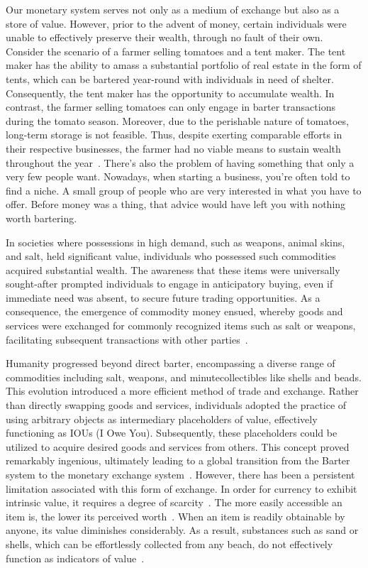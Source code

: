 Our monetary system serves not only as a medium of exchange but also as a store of value. However, prior to the advent of money, certain individuals were unable to effectively preserve their wealth, through no fault of their own. Consider the scenario of a farmer selling tomatoes and a tent maker. The tent maker has the ability to amass a substantial portfolio of real estate in the form of tents, which can be bartered year-round with individuals in need of shelter. Consequently, the tent maker has the opportunity to accumulate wealth. In contrast, the farmer selling tomatoes can only engage in barter transactions during the tomato season. Moreover, due to the perishable nature of tomatoes, long-term storage is not feasible. Thus, despite exerting comparable efforts in their respective businesses, the farmer had no viable means to sustain wealth
throughout the year~\cite{de2016origins}. There's also the problem of having something that only a very few people want. Nowadays, when starting a business, you're often told to find a niche. A small group of people who are very interested in what you have to offer. Before money was a thing, that advice would have left you with nothing worth bartering.

In societies where possessions in high demand, such as weapons, animal skins, and salt, held significant value, individuals who possessed such commodities acquired substantial wealth. The awareness that these items were universally sought-after prompted individuals to engage in anticipatory buying, even if immediate need was absent, to secure future trading opportunities. As a consequence, the emergence of commodity money ensued, whereby goods and services were exchanged for commonly recognized items such as salt or weapons, facilitating subsequent transactions with other parties~\cite{polanyi1965trade}.

Humanity progressed beyond direct barter, encompassing a diverse range of commodities including salt, weapons, and minutecollectibles like shells and beads. This evolution introduced a more efficient method of trade and exchange. Rather than directly swapping goods and services, individuals adopted the practice of using arbitrary objects as intermediary placeholders of value, effectively functioning as IOUs (I Owe You). Subsequently, these placeholders could be utilized to acquire desired goods and services from others. This concept proved remarkably ingenious, ultimately leading to a global transition from the Barter system to the monetary exchange system~\cite{graeber2012debt}. However, there has been a persistent
limitation associated with this form of exchange. In order for currency to exhibit intrinsic value, it requires a degree of scarcity~\cite{smith2010wealth, ricardo1821principles}. The more easily accessible an item is, the lower its perceived worth~\cite{marshall2009principles}. When an item is readily obtainable by anyone, its value diminishes considerably. As a result, substances such as sand or shells, which can be effortlessly collected from any beach, do not effectively function as indicators of value~\cite{principlesmenger, hicks1936keynes}.

